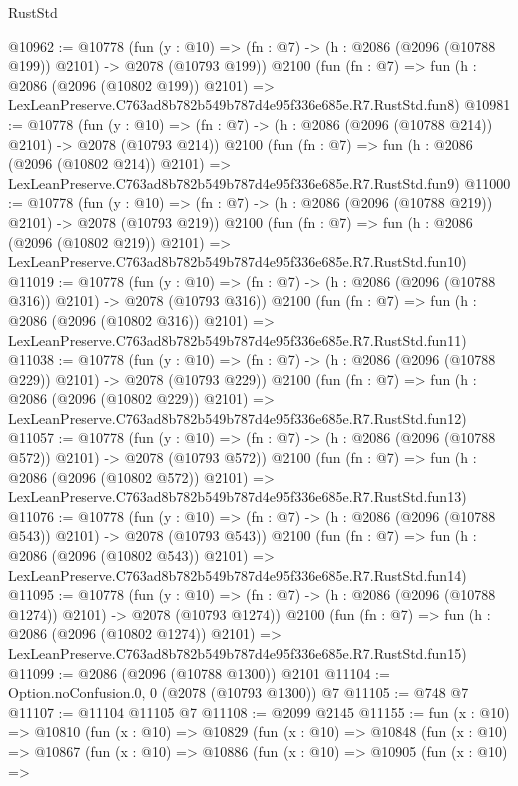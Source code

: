 \begin{lexlean}{RustStd}
\begin{coremodule}
@10962 := @10778
    (fun (y : @10) => (fn : @7) -> (h : @2086 (@2096 (@10788 @199)) @2101) -> @2078 (@10793 @199))
    @2100
    (fun (fn : @7) =>
    fun (h : @2086 (@2096 (@10802 @199)) @2101) =>
    LexLeanPreserve.C763ad8b782b549b787d4e95f336e685e.R7.RustStd.fun8)
@10981 := @10778
    (fun (y : @10) => (fn : @7) -> (h : @2086 (@2096 (@10788 @214)) @2101) -> @2078 (@10793 @214))
    @2100
    (fun (fn : @7) =>
    fun (h : @2086 (@2096 (@10802 @214)) @2101) =>
    LexLeanPreserve.C763ad8b782b549b787d4e95f336e685e.R7.RustStd.fun9)
@11000 := @10778
    (fun (y : @10) => (fn : @7) -> (h : @2086 (@2096 (@10788 @219)) @2101) -> @2078 (@10793 @219))
    @2100
    (fun (fn : @7) =>
    fun (h : @2086 (@2096 (@10802 @219)) @2101) =>
    LexLeanPreserve.C763ad8b782b549b787d4e95f336e685e.R7.RustStd.fun10)
@11019 := @10778
    (fun (y : @10) => (fn : @7) -> (h : @2086 (@2096 (@10788 @316)) @2101) -> @2078 (@10793 @316))
    @2100
    (fun (fn : @7) =>
    fun (h : @2086 (@2096 (@10802 @316)) @2101) =>
    LexLeanPreserve.C763ad8b782b549b787d4e95f336e685e.R7.RustStd.fun11)
@11038 := @10778
    (fun (y : @10) => (fn : @7) -> (h : @2086 (@2096 (@10788 @229)) @2101) -> @2078 (@10793 @229))
    @2100
    (fun (fn : @7) =>
    fun (h : @2086 (@2096 (@10802 @229)) @2101) =>
    LexLeanPreserve.C763ad8b782b549b787d4e95f336e685e.R7.RustStd.fun12)
@11057 := @10778
    (fun (y : @10) => (fn : @7) -> (h : @2086 (@2096 (@10788 @572)) @2101) -> @2078 (@10793 @572))
    @2100
    (fun (fn : @7) =>
    fun (h : @2086 (@2096 (@10802 @572)) @2101) =>
    LexLeanPreserve.C763ad8b782b549b787d4e95f336e685e.R7.RustStd.fun13)
@11076 := @10778
    (fun (y : @10) => (fn : @7) -> (h : @2086 (@2096 (@10788 @543)) @2101) -> @2078 (@10793 @543))
    @2100
    (fun (fn : @7) =>
    fun (h : @2086 (@2096 (@10802 @543)) @2101) =>
    LexLeanPreserve.C763ad8b782b549b787d4e95f336e685e.R7.RustStd.fun14)
@11095 := @10778
    (fun (y : @10) => (fn : @7) -> (h : @2086 (@2096 (@10788 @1274)) @2101) -> @2078 (@10793 @1274))
    @2100
    (fun (fn : @7) =>
    fun (h : @2086 (@2096 (@10802 @1274)) @2101) =>
    LexLeanPreserve.C763ad8b782b549b787d4e95f336e685e.R7.RustStd.fun15)
@11099 := @2086 (@2096 (@10788 @1300)) @2101
@11104 := Option.noConfusion.{0, 0} (@2078 (@10793 @1300)) @7
@11105 := @748 @7
@11107 := @11104 @11105 @7
@11108 := @2099 @2145
@11155 := fun (x : @10) =>
  @10810
    (fun (x : @10) =>
    @10829
      (fun (x : @10) =>
      @10848
        (fun (x : @10) =>
        @10867
          (fun (x : @10) =>
          @10886
            (fun (x : @10) =>
            @10905
              (fun (x : @10) =>

\end{coremodule}
\end{lexlean}
